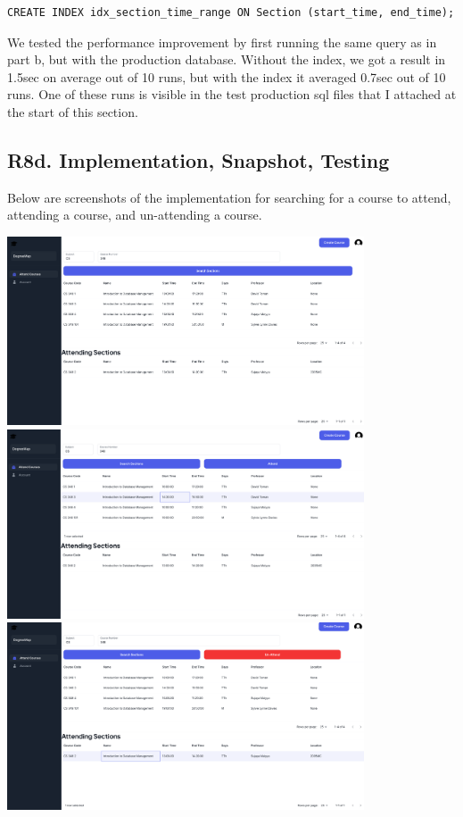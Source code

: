 \documentclass[12pt, a4paper]{article}
\begin{document}
\begin{verbatim}
CREATE INDEX idx_section_time_range ON Section (start_time, end_time);
\end{verbatim}
We tested the performance improvement by first running the same query as in part b, but with the production database. Without the index, we got a result in 1.5sec on average out of 10 runs, but with the index it averaged 0.7sec out of 10 runs. One of these runs is visible in the test production sql files that I attached at the start of this section.
\subsection*{R8d. Implementation, Snapshot, Testing}
Below are screenshots of the implementation for searching for a course to attend, attending a course, and un-attending a course.
\begin{center}
    \includegraphics[width=400px]{R8/i1}
    \includegraphics[width=400px]{R8/i2}   
    \includegraphics[width=400px]{R8/i3} 
\end{center}
\end{document}
